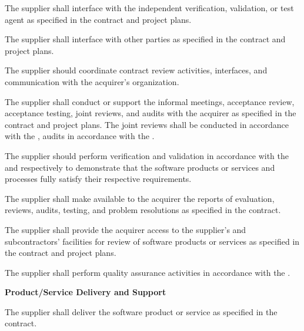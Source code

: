 \begin{adjustwidth}{2em}{0pt}
\begin{compactenum}
\begin{compactenum}
						\item The supplier shall interface with the independent verification, validation, or test agent as specified in the contract and project plans.

						\item The supplier shall interface with other parties as specified in the contract and project plans.

						\item The supplier should coordinate contract review activities, interfaces, and communication with the acquirer's organization.

						\item The supplier shall conduct or support the informal meetings, acceptance review, acceptance testing, joint reviews, and audits with the acquirer as specified in the contract and project plans. The joint reviews shall be conducted in accordance with the , audits in accordance with the .

						\item The supplier should perform verification and validation in accordance with the  and  respectively to demonstrate that the software products or services and processes fully satisfy their respective requirements.

						\item The supplier shall make available to the acquirer the reports of evaluation, reviews, audits, testing, and problem resolutions as specified in the contract.

						\item The supplier shall provide the acquirer access to the supplier's and subcontractors' facilities for review of software products or services as specified in the contract and project plans.

						\item The supplier shall perform quality assurance activities in accordance with the .

					\end{compactenum}

					\item {\bf Product/Service Delivery and Support}
					\begin{compactenum}

						\item The supplier shall deliver the software product or service as specified in the contract.


\end{compactenum}
\end{compactenum}
\end{adjustwidth}
